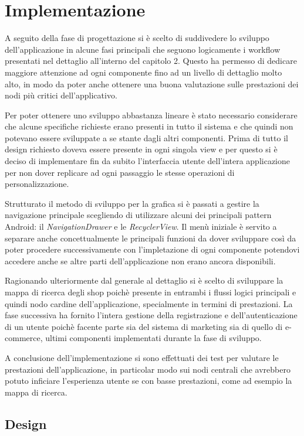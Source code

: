 
\chapter{Implementazione}

A seguito della fase di progettazione si è scelto di suddivedere lo
sviluppo dell'applicazione in alcune fasi principali che seguono logicamente
i workflow presentati nel dettaglio all'interno del capitolo 2. Questo
ha permesso di dedicare maggiore attenzione ad ogni componente fino
ad un livello di dettaglio molto alto, in modo da poter anche ottenere
una buona valutazione sulle prestazioni dei nodi più critici dell'applicativo.

Per poter ottenere uno sviluppo abbastanza lineare è stato necessario
considerare che alcune specifiche richieste erano presenti in tutto
il sistema e che quindi non potevano essere sviluppate a se stante
dagli altri componenti. Prima di tutto il design richiesto doveva
essere presente in ogni singola view e per questo si è deciso di implementare
fin da subito l'interfaccia utente dell'intera applicazione per non
dover replicare ad ogni passaggio le stesse operazioni di personalizzazione.

Strutturato il metodo di sviluppo per la grafica si è passati a gestire
la navigazione principale scegliendo di utilizzare alcuni dei principali
pattern Android: il \textit{NavigationDrawer} e le \textit{RecyclerView}.
Il menù iniziale è servito a separare anche concettualmente le principali
funzioni da dover sviluppare così da poter procedere successivamente
con l'impletazione di ogni componente potendovi accedere anche se
altre parti dell'applicazione non erano ancora disponibili.

Ragionando ulteriormente dal generale al dettaglio si è scelto di
sviluppare la mappa di ricerca degli shop poichè presente in entrambi
i flussi logici principali e quindi nodo cardine dell'applicazione,
specialmente in termini di prestazioni. La fase successiva ha fornito
l'intera gestione della registrazione e dell'autenticazione di un
utente poichè facente parte sia del sistema di marketing sia di quello
di e-commerce, ultimi componenti implementati durante la fase di sviluppo.

A conclusione dell'implementazione si sono effettuati dei test per
valutare le prestazioni dell'applicazione, in particolar modo sui
nodi centrali che avrebbero potuto inficiare l'esperienza utente se
con basse prestazioni, come ad esempio la mappa di ricerca.

\section{Design}

